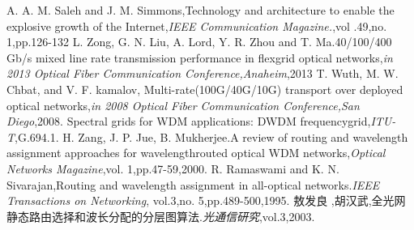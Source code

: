 \documentclass[master]{thesis-uestc}
\begin{document}
\begin{thebibliography}{1}
A. A. M. Saleh and J. M. Simmons,Technology and architecture to enable the explosive growth of the Internet,\emph{IEEE Communication Magazine.},vol .49,no. 1,pp.126-132
L. Zong, G. N. Liu, A. Lord, Y. R. Zhou and T. Ma.40/100/400 Gb/s mixed line rate transmission performance in flexgrid optical networks,\emph{in 2013 Optical Fiber Communication Conference,Anaheim},2013
T. Wuth, M. W. Chbat, and V. F. kamalov, Multi-rate(100G/40G/10G) transport over deployed optical networks,\emph{in 2008 Optical Fiber Communication Conference,San Diego},2008.
Spectral grids for WDM applications: DWDM frequencygrid,\emph{ITU-T},G.694.1.
H. Zang, J. P. Jue, B. Mukherjee.A review of routing and wavelength assignment approaches for wavelengthrouted optical WDM networks,\emph{Optical Networks Magazine},vol. 1,pp.47-59,2000.
R. Ramaswami and K. N. Sivarajan,Routing and wavelength assignment in all-optical networks.\emph{IEEE Transactions on Networking}, vol.3,no. 5,pp.489-500,1995.
敖发良 ,胡汉武,全光网静态路由选择和波长分配的分层图算法.\emph{光通信研究},vol.3,2003.
\end{thebibliography}
\end{document}
